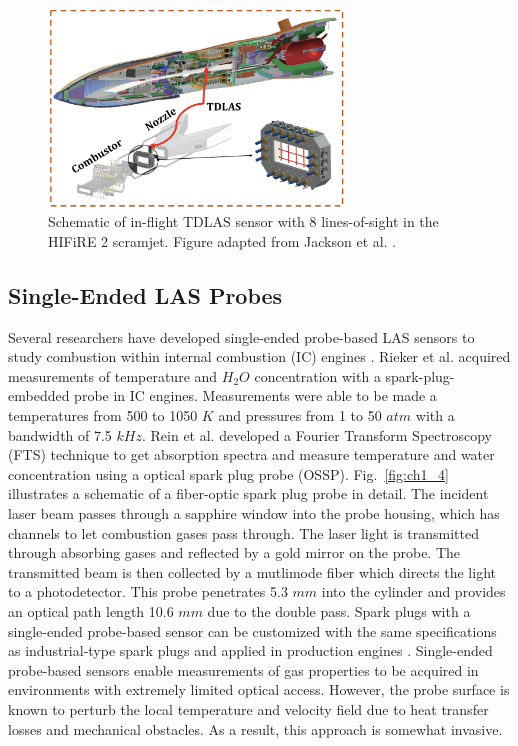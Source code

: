 \begin{figure}[ht]
    \centering
        \includegraphics[width=0.7\textwidth]{fig/ch1_fig6_v2.png}
        \caption{Schematic of in-flight TDLAS sensor with 8 lines-of-sight in the HIFiRE 2 scramjet. Figure adapted from Jackson et al. \cite{Jackson2015}.}
    \label{fig:ch1_3}
\end{figure}


\subsection{Single-Ended LAS Probes}
Several researchers have developed single-ended probe-based LAS sensors to study combustion within internal combustion (IC) engines \cite{Melin2017, RIEKER20073041, Jeffries2010, Witzel2013, Bürkle2018}. Rieker et al. \cite{RIEKER20073041} acquired measurements of temperature and $H_2O$ concentration with a spark-plug-embedded probe in IC engines. Measurements were able to be made a temperatures from 500 to 1050 $K$ and pressures from 1 to 50 $atm$ with a bandwidth of 7.5 $kHz$. Rein et al. \cite{Rein:10} developed a Fourier Transform Spectroscopy (FTS) technique to get absorption spectra and measure temperature and water concentration using a optical spark plug probe (OSSP). Fig.\ \ref{fig:ch1_4} illustrates a schematic of a fiber-optic spark plug probe in detail. The incident laser beam passes through a sapphire window into the probe housing, which has channels to let combustion gases pass through. The laser light is transmitted through absorbing gases and reflected by a gold mirror on the probe. The transmitted beam is then collected by a mutlimode fiber which directs the light to a photodetector. This probe penetrates 5.3 $mm$ into the cylinder and provides an optical path length 10.6 $mm$ due to the double pass. Spark plugs with a single-ended probe-based sensor can be customized with the same specifications as industrial-type spark plugs and applied in production engines \cite{Jeffries2010}. Single-ended probe-based sensors enable measurements of gas properties to be acquired in environments with extremely limited optical access. However, the probe surface is known to perturb the local temperature and velocity field due to heat transfer losses and mechanical obstacles. As a result, this approach is somewhat invasive.

